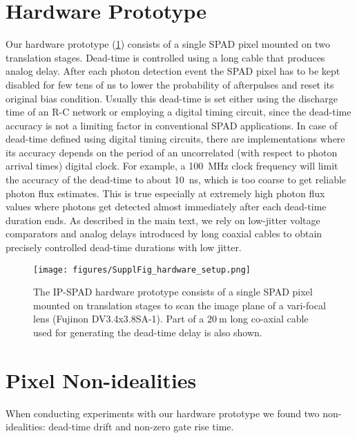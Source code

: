 \section{Hardware Prototype\label{suppl:hardware}}
Our hardware prototype (\ref{fig:hardware_photo})
consists of a single SPAD pixel mounted on two
translation stages. Dead-time is controlled using a long cable that produces
analog delay.  After each photon detection event the SPAD pixel has to be kept
disabled for few tens of \si{\ns} to lower the probability of afterpulses
\cite{cova1991} and reset its original bias condition. Usually this dead-time
is set either using the discharge time of an R-C network or employing a digital
timing circuit, since the dead-time accuracy is not a limiting factor in
conventional SPAD applications. In case of dead-time defined using digital
timing circuits, there are implementations where its accuracy depends on the
period of an uncorrelated (with respect to photon arrival times) digital clock.
For example, a \num{100}~\si{\mega\hertz} clock frequency will limit the
accuracy of the dead-time to about \num{10}~\si{\ns}, which is too coarse to
get reliable photon flux estimates.  This is true especially at extremely high
photon flux values where photons get detected almost immediately after each
dead-time duration ends. As described in the main text, we rely on low-jitter
voltage comparators and analog delays introduced by long coaxial cables to
obtain precisely controlled dead-time durations with low jitter.

\begin{figure}[!ht]
  \centering \texttt{[image: figures/SupplFig\_hardware\_setup.png]}
  \caption{The IP-SPAD hardware prototype consists of a single SPAD pixel mounted on
    translation stages to scan the image plane of a vari-focal lens
    (Fujinon DV3.4x3.8SA-1). Part of a $\SI{20}{\m}$ long co-axial cable used for
    generating the dead-time delay is also shown.
    \label{fig:hardware_photo}}
\end{figure}

\section{Pixel Non-idealities}
When conducting experiments with our hardware prototype we found two
non-idealities: dead-time drift and non-zero gate rise time.  
